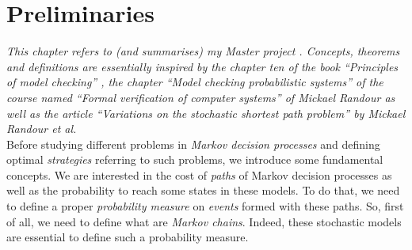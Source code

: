 \chapter{Preliminaries} \label{preliminaries}
\textit{This chapter refers to (and summarises) my Master project \cite{Flo2017}. Concepts, theorems and definitions are essentially inspired by the chapter ten of the book ``Principles of model checking'' \cite{PMC}, the chapter ``Model checking probabilistic systems'' of the course named ``Formal verification of computer systems'' of Mickael Randour \cite{MRV} as well as the article ``Variations on the stochastic shortest path problem'' \cite{DBLP:journals/corr/RandourRS14a} by Mickael Randour et al.} \\

Before studying different %
problems in \textit{Markov decision
processes} and defining optimal \textit{strategies} referring to such problems, we introduce some fundamental concepts. We are interested in the cost of \textit{paths} of Markov decision processes as well as the probability to reach some states in these models.
To do that, we need to define a proper \textit{probability measure} on \textit{events} formed with these paths.
So, first of all, we need to define what are \textit{Markov chains}.
Indeed, these stochastic models are essential to define such a probability measure.

